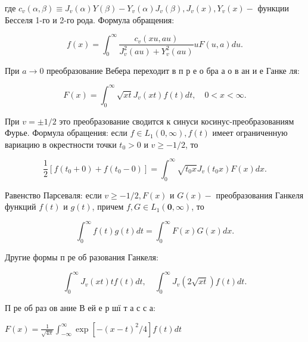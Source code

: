 \documentclass[10pt]{article}
\begin{document}
где $c_{v}(\alpha, \beta) \equiv J_{v}(\alpha) Y(\beta)-Y_{v}(\alpha) J_{v}(\beta), J_{v}(x), Y_{v}(x)-$ функции Бесселя 1-го и 2-го рода. Формула обращения:



\[

f(x)=\int_{0}^{\infty} \frac{c_{v}(x u, a u)}{J_{v}^{2}(a u)+Y_{v}^{2}(a u)} u F(u, a) d u .

\]



При $a \rightarrow 0$ преобразование Вебера переходит в п р е о бра $а$ о в ан и е Ганке ля:



\[

F(x)=\int_{0}^{\infty} \sqrt{x t} J_{v}(x t) f(t) d t, \quad 0<x<\infty .

\]



При $v= \pm 1 / 2$ это преобразование сводится к синуси косинус-преобразованиям Фурье. Формула обращения: если $f \in L_{1}(0, \infty), f(t)$ имеет ограниченную вариацию в окрестности точки $t_{0}>0$ и $v \geqslant-1 / 2$, то



\[

\frac{1}{2}\left[f\left(t_{0}+0\right)+f\left(t_{0}-0\right)\right]=\int_{0}^{\infty} \sqrt{t_{0} x} J_{v}\left(t_{0} x\right) F(x) d x .

\]



Равенство Парсеваля: если $v \geqslant-1 / 2, F(x)$ и $G(x)-$ преобразования Ганкеля функций $f(t)$ и $g(t)$, причем $f, G \in L_{1}(\mathbf{0}, \infty)$, то



\[

\int_{0}^{\infty} f(t) g(t) d t=\int_{0}^{\infty} F(x) G(x) d x .

\]



Другие формы п ре об разования Ганкеля:



\[

\int_{0}^{\infty} J_{v}(x t) t f(t) d t, \quad \int_{0}^{\infty} J_{v}(2 \sqrt{x t}) f(t) d t .

\]



П ре об раз ов ание В ей е р шї т а с с а:



$F(x)=\frac{1}{\sqrt{4 \pi}} \int_{-\infty}^{\infty} \exp \left[-(x-t)^{2} / 4\right] f(t) d t$
\end{document}
